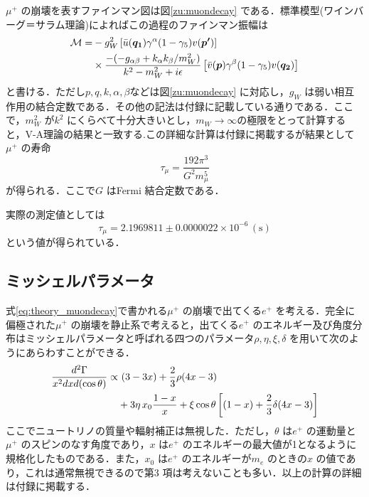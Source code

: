 	$\mu^{+}$ の崩壊を表すファインマン図は図\ref{zu:muondecay} である．標準模型(ワインバーグ＝サラム理論)によればこの過程のファインマン振幅は
	\begin{align}
	\mathcal{M} = &-g_{W}^2\left[\Bar{u}(\bm{q_{1}})\gamma^{\alpha}(1 - \gamma_{5})v(\bm{p'})\right] \notag \\ 
	&\times \frac{-(-g_{\alpha\beta} + k_{\alpha}k_{\beta}/m_{W}^2)}{k^{2} - m_{W}^2 + i\epsilon}\left[\Bar{v}(\bm{p})\gamma^{\beta}(1 - \gamma_5)v(\bm{q_{2}})\right]
	\label{eq:theory_muondecayamp}
	\end{align}
	と書ける．ただし$p, q, k, \alpha, \beta$などは図\ref{zu:muondecay} に対応し，$g_{W}$ は弱い相互作用の結合定数である．その他の記法は付録に記載している通りである．ここで，$m_{W}^2$ が$k^2$ にくらべて十分大きいとし，$m_{W} \rightarrow \infty$の極限をとって計算すると，V-A理論の結果と一致する.この詳細な計算は付録に掲載するが結果として$\mu^+$ の寿命
	\begin{equation}
	\tau_{\mu} = \frac{192\pi^3}{G^{2} m_{\mu}^{5}}
        \label{eq:thory_muonlifetime}
	\end{equation}
	が得られる．ここで$G$ はFermi 結合定数である．

	実際の測定値としては
	\[\tau_{\mu} = 2.1969811 \pm 0.0000022 \times 10^{-6} \,(\mathrm{s})\]
	という値が得られている．\cite{PDG}
	
	\subsection{ミッシェルパラメータ}
	式\eqref{eq:theory_muondecay}で書かれる$\mu^{+}$ の崩壊で出てくる$e^{+}$ を考える．完全に偏極された$\mu^{+}$ の崩壊を静止系で考えると，出てくる$e^{+}$ のエネルギー及び角度分布はミッシェルパラメータと呼ばれる四つのパラメータ$\rho, \eta, \xi, \delta$ を用いて次のようにあらわすことができる．\cite{michel_parameter}
	\begin{align}
	\frac{d^2\Gamma}{x^{2}dxd(\cos \theta)} \propto& \,\,(3 - 3x) + \frac{2}{3}\rho (4x - 3) \notag \\
	&+ 3 \eta \,x_{0} \frac{1-x}{x} + \xi \cos \theta \left[(1 - x) + \frac{2}{3} \delta (4x - 3)\right]
	\label{eq:theory_michel}
	\end{align}
	ここでニュートリノの質量や輻射補正は無視した．ただし，$\theta$ は$e^{+}$ の運動量と$\mu^{+}$ のスピンのなす角度であり，$x$ は$e^{+}$ のエネルギーの最大値が1となるように規格化したものである．また，$x_0$ は$e^{+}$ のエネルギーが$m_{e}$ のときの$x$ の値であり，これは通常無視できるので第3 項は考えないことも多い．以上の計算の詳細は付録に掲載する．

